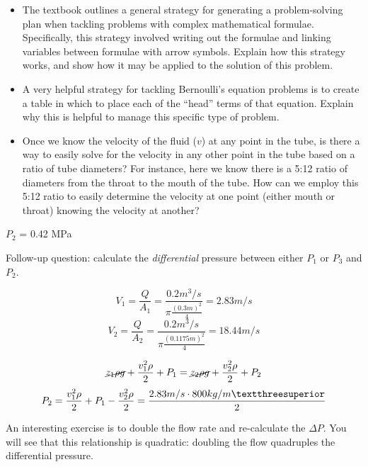 \begin{itemize}
\item{} The textbook outlines a general strategy for generating a problem-solving plan when tackling problems with complex mathematical formulae.  Specifically, this strategy involved writing out the formulae and linking variables between formulae with arrow symbols.  Explain how this strategy works, and show how it may be applied to the solution of this problem.
\item{} A very helpful strategy for tackling Bernoulli's equation problems is to create a table in which to place each of the ``head'' terms of that equation.  Explain why this is helpful to manage this specific type of problem.
\item{} Once we know the velocity of the fluid ($v$) at any point in the tube, is there a way to easily solve for the velocity in any other point in the tube based on a ratio of tube diameters?  For instance, here we know there is a 5:12 ratio of diameters from the throat to the mouth of the tube.  How can we employ this 5:12 ratio to easily determine the velocity at one point (either mouth or throat) knowing the velocity at another?
\end{itemize}







$P_2$ = 0.42 MPa     

\vskip 10pt


Follow-up question: calculate the {\it differential} pressure between either $P_1$ or $P_3$ and $P_2$.








$$V_1=\frac{Q}{A_1}=\frac{0.2m^3/s}{\pi \frac{(0.3m)^2}{4}}=2.83m/s$$
$$V_2=\frac{Q}{A_2}=\frac{0.2m^3/s}{\pi \frac{(0.1175m)^2}{4}}=18.44m/s$$




$$\cancel{z_1 \rho g} + {v_1^2 \rho \over 2} + P_1 = \cancel{z_2 \rho g} + {v_2^2 \rho \over 2} + P_2$$
$$P_2={v_1^2 \rho \over 2} + P_1 - {v_2^2 \rho \over 2}=\frac{2.83m/s\cdot 800kg/m³}{2}$$

An interesting exercise is to double the flow rate and re-calculate the $\Delta P$.  You will see that this relationship is quadratic: doubling the flow quadruples the differential pressure.




